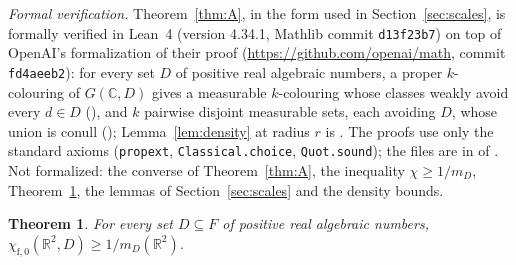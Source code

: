 \documentclass[11pt,a4paper]{amsart}
\newtheorem{theorem}{Theorem}
\theoremstyle{definition}
\theoremstyle{remark}
\newcommand{\C}{\mathbb{C}}
\newcommand{\R}{\mathbb{R}}
\begin{document}
\emph{Formal verification.} Theorem~\ref{thm:A}, in the form used in Section~\ref{sec:scales}, is formally verified
in Lean~4 (version 4.34.1, Mathlib commit \texttt{d13f23b7}) on top of OpenAI's formalization of their proof
(\url{https://github.com/openai/math}, commit \texttt{fd4aeeb2}): for every set $D$ of positive real algebraic numbers,
a proper $k$-colouring of $G(\C,D)$ gives a measurable $k$-colouring whose classes weakly avoid every $d\in D$
(), and $k$ pairwise disjoint measurable sets, each avoiding $D$,
whose union is conull (); Lemma~\ref{lem:density} at radius $r$ is
. The proofs use only the standard axioms (\texttt{propext},
\texttt{Classical.choice}, \texttt{Quot.sound}); the files are in  of
\cite{Repo}. Not formalized: the converse of Theorem~\ref{thm:A}, the inequality $\chi\ge1/m_D$, Theorem~\ref{thm:B},
the lemmas of Section~\ref{sec:scales} and the density bounds.

\begin{theorem}\label{thm:B}
For every set $D\subseteq F$ of positive real algebraic numbers, $\chi_{\mathrm f,0}(\R^2,D)\ge 1/m_D(\R^2)$.
\end{theorem}
\end{document}
